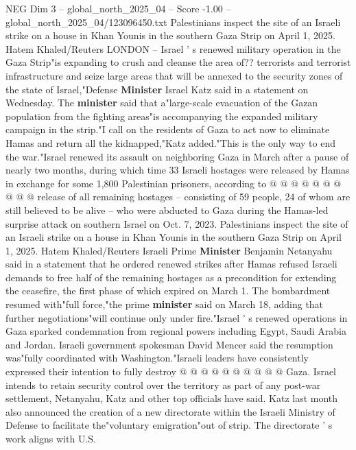 \begin{textsample}{NEG Dim 3 – global\_north\_2025\_04 – Score -1.00 – global\_north\_2025\_04/123096450.txt}  \label{ex:f3_neg_401}
Palestinians inspect the site of an Israeli strike on a house in Khan Younis in the southern Gaza Strip on April 1, 2025.
Hatem Khaled/Reuters LONDON -- Israel ' s renewed military operation in the Gaza Strip"is expanding to crush and cleanse the area of?? terrorists and terrorist infrastructure and seize large areas that will be annexed to the security zones of the state of Israel,"Defense \textbf{Minister} Israel Katz said in a statement on Wednesday.
The \textbf{minister} said that a"large-scale evacuation of the Gazan population from the fighting areas"is accompanying the expanded military campaign in the strip."I call on the residents of Gaza to act now to eliminate Hamas and return all the kidnapped,"Katz added."This is the only way to end the war."Israel renewed its assault on neighboring Gaza in March after a pause of nearly two months, during which time 33 Israeli hostages were released by Hamas in exchange for some 1,800 Palestinian prisoners, according to @ @ @ @ @ @ @ @ @ @ release of all remaining hostages -- consisting of 59 people, 24 of whom are still believed to be alive -- who were abducted to Gaza during the Hamas-led surprise attack on southern Israel on Oct. 7, 2023.
Palestinians inspect the site of an Israeli strike on a house in Khan Younis in the southern Gaza Strip on April 1, 2025.
Hatem Khaled/Reuters Israeli Prime \textbf{Minister} Benjamin Netanyahu said in a statement that he ordered renewed strikes after Hamas refused Israeli demands to free half of the remaining hostages as a precondition for extending the ceasefire, the first phase of which expired on March 1.
The bombardment resumed with"full force,"the prime \textbf{minister} said on March 18, adding that further negotiations"will continue only under fire."Israel ' s renewed operations in Gaza sparked condemnation from regional powers including Egypt, Saudi Arabia and Jordan.
Israeli government spokesman David Mencer said the resumption was"fully coordinated with Washington."Israeli leaders have consistently expressed their intention to fully destroy @ @ @ @ @ @ @ @ @ @ Gaza.
Israel intends to retain security control over the territory as part of any post-war settlement, Netanyahu, Katz and other top officials have said.
Katz last month also announced the creation of a new directorate within the Israeli Ministry of Defense to facilitate the"voluntary emigration"out of strip.
The directorate ' s work aligns with U.S.

\end{textsample}
